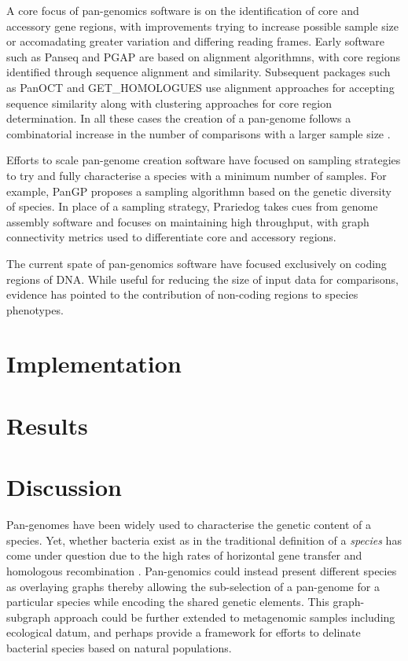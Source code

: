 \documentclass{article}
\begin{document}
A core focus of pan-genomics software is on the identification of core and accessory gene regions, with improvements trying to increase possible sample size or accomadating greater variation and differing reading frames.
Early software such as Panseq \cite{laing2010pan} and PGAP \cite{zhao2011pgap} are based on alignment algorithmns, with core regions identified through sequence alignment and similarity.
Subsequent packages such as PanOCT \cite{fouts2012panoct} and GET_HOMOLOGUES \cite{contreras2013get_homologues} use alignment approaches for accepting sequence similarity along with clustering approaches for core region determination.
In all these cases the creation of a pan-genome follows a combinatorial increase in the number of comparisons with a larger sample size \cite{vernikos2015ten}.

Efforts to scale pan-genome creation software have focused on sampling strategies to try and fully characterise a species with a minimum number of samples.
For example, PanGP \cite{zhao2014pangp} proposes a sampling algorithmn based on the genetic diversity of species.
In place of a sampling strategy, Prariedog takes cues from genome assembly software and focuses on maintaining high throughput, with graph connectivity metrics used to differentiate core and accessory regions.


The current spate of pan-genomics software have focused exclusively on coding regions of DNA.
While useful for reducing the size of input data for comparisons, evidence \cite{} has pointed to the contribution of non-coding regions to species phenotypes.


\section{Implementation}

\section{Results}

\section{Discussion}

Pan-genomes have been widely used to characterise the genetic content of a species.
Yet, whether bacteria exist as in the traditional definition of a \textit{species} has come under question due to the high rates of horizontal gene transfer and homologous recombination \cite{fraser2009bacterial}.
Pan-genomics could instead present different species as overlaying graphs thereby allowing the sub-selection of a pan-genome for a particular species while encoding the shared genetic elements.
This graph-subgraph approach could be further extended to metagenomic samples including ecological datum, and perhaps provide a framework for efforts \cite{caro2012bacterial} to delinate bacterial species based on natural populations.
\end{document}
